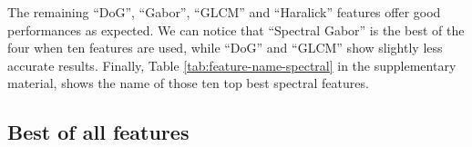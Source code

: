 \documentclass[../thesis.tex]{subfiles}
\begin{document}
    The remaining ``DoG'', ``Gabor'', ``GLCM'' and ``Haralick'' features offer good performances as expected. We can notice that ``Spectral Gabor'' is the best of the four when ten features are used, while ``DoG'' and ``GLCM'' show slightly less accurate results. Finally, Table \ref{tab:feature-name-spectral} in the supplementary material, shows the name of those ten top best spectral features.
    
    \subsection{Best of all features}
    \label{sec:weed-discrimination-best-all}
    
    
\end{document}
